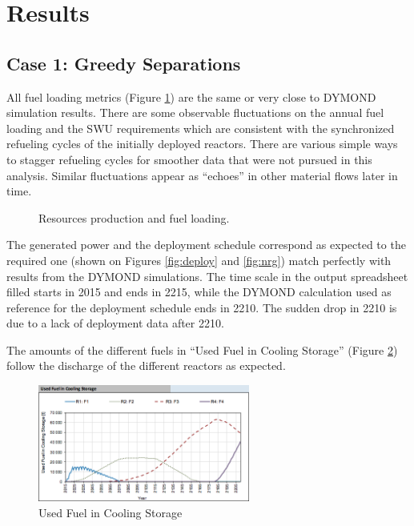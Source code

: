 \documentclass[12pt]{article}
\begin{document}
\section{Results}

\subsection{Case 1: Greedy Separations}

All fuel loading metrics (Figure \ref{fig:ResourceUsed}) are the same or very
close to DYMOND simulation results. There are some observable fluctuations on the
annual fuel loading and the SWU requirements which are consistent with the
synchronized refueling cycles of the initially deployed reactors.  There are
various simple ways to stagger refueling cycles for smoother data that were not
pursued in this analysis.  Similar fluctuations appear as ``echoes'' in other
material flows later in time.

\begin{figure}[h!]
    \centering
    \caption{Resources production and fuel loading.\label{fig:ResourceUsed} }
\end{figure}

The generated power and the deployment schedule correspond as expected to the
required one (shown on Figures \ref{fig:deploy} and \ref{fig:nrg}) match
perfectly with results from the DYMOND simulations. The time scale in the output
spreadsheet filled starts in 2015 and ends in 2215, while the DYMOND calculation
used as reference for the deployment schedule ends in 2210. The sudden drop in
2210 is due to a lack of deployment data after 2210.


The amounts of the different fuels in ``Used Fuel in Cooling Storage'' (Figure
\ref{fig:UFCS_1}) follow the discharge of the different reactors as expected.

\begin{figure}[h!]
    \centering
    \includegraphics[width=0.62\textwidth]{img/usedFuelInCooling}
    \caption{Used Fuel in Cooling Storage}
    \label{fig:UFCS_1}
\end{figure}
\end{document}
